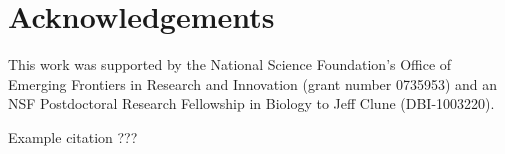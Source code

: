 \section{Acknowledgements}

This work was supported by the National Science Foundation's Office of
Emerging Frontiers in Research and Innovation (grant number 0735953) and an NSF Postdoctoral Research Fellowship in Biology to Jeff Clune (DBI-1003220).

Example citation ??? \cite{yosinski2011evolving-robot-gaits}
